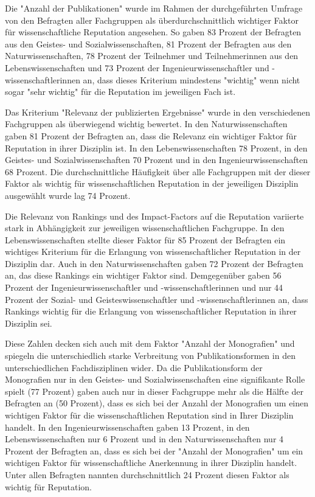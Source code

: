Die "Anzahl der Publikationen" wurde im Rahmen der durchgeführten Umfrage von den Befragten aller Fachgruppen als überdurchschnittlich wichtiger Faktor für wissenschaftliche Reputation angesehen. So gaben 83 Prozent der Befragten aus den Geistes- und Sozialwissenschaften, 81 Prozent der Befragten aus den Naturwissenschaften, 78 Prozent der Teilnehmer und Teilnehmerinnen aus den Lebenswissenschaften und 73 Prozent der Ingenieurwissenschaftler und -wissenschaftlerinnen an, dass dieses Kriterium mindestens "wichtig" wenn nicht sogar "sehr wichtig" für die Reputation im jeweiligen Fach ist.

Das Kriterium "Relevanz der publizierten Ergebnisse" wurde in den verschiedenen Fachgruppen als überwiegend wichtig bewertet. In den Naturwissenschaften gaben 81 Prozent der Befragten an, dass die Relevanz ein wichtiger Faktor für Reputation in ihrer Disziplin ist. In den Lebenswissenschaften 78 Prozent, in den Geistes- und Sozialwissenschaften 70 Prozent und in den Ingenieurwissenschaften 68 Prozent. Die durchschnittliche Häufigkeit über alle Fachgruppen mit der dieser Faktor als wichtig für wissenschaftlichen Reputation in der jeweiligen Disziplin ausgewählt wurde lag 74 Prozent.

Die Relevanz von Rankings und des Impact-Factors auf die Reputation variierte stark in Abhängigkeit zur jeweiligen wissenschaftlichen Fachgruppe. In den Lebenswissenschaften stellte dieser Faktor für 85 Prozent der Befragten ein wichtiges Kriterium für die Erlangung von wissenschaftlicher Reputation in der Disziplin dar. Auch in den Naturwissenschaften gaben 72 Prozent der Befragten an, das diese Rankings ein wichtiger Faktor sind. Demgegenüber gaben 56 Prozent der Ingenieurwissenschaftler und -wissenschaftlerinnen und nur 44 Prozent der Sozial- und Geisteswissenschaftler und -wissenschaftlerinnen an, dass Rankings wichtig für die Erlangung von wissenschaftlicher Reputation in ihrer Disziplin sei.

Diese Zahlen decken sich auch mit dem Faktor "Anzahl der Monografien" und spiegeln die unterschiedlich starke Verbreitung von Publikationsformen in den unterschiedlichen Fachdisziplinen wider. Da die Publikationsform der Monografien nur in den Geistes- und Sozialwissenschaften eine signifikante Rolle spielt (77 Prozent) gaben auch nur in dieser Fachgruppe mehr als die Hälfte der Befragten an (50 Prozent), dass es sich bei der Anzahl der Monografien um einen wichtigen Faktor für die wissenschaftlichen Reputation sind in Ihrer Disziplin handelt. In den Ingenieurwissenschaften gaben 13 Prozent, in den Lebenswissenschaften nur 6 Prozent und in den Naturwissenschaften nur 4 Prozent der Befragten an, dass es sich bei der "Anzahl der Monografien" um ein wichtigen Faktor für wissenschaftliche Anerkennung in ihrer Disziplin handelt. Unter allen Befragten nannten durchschnittlich 24 Prozent diesen Faktor als wichtig für Reputation.

